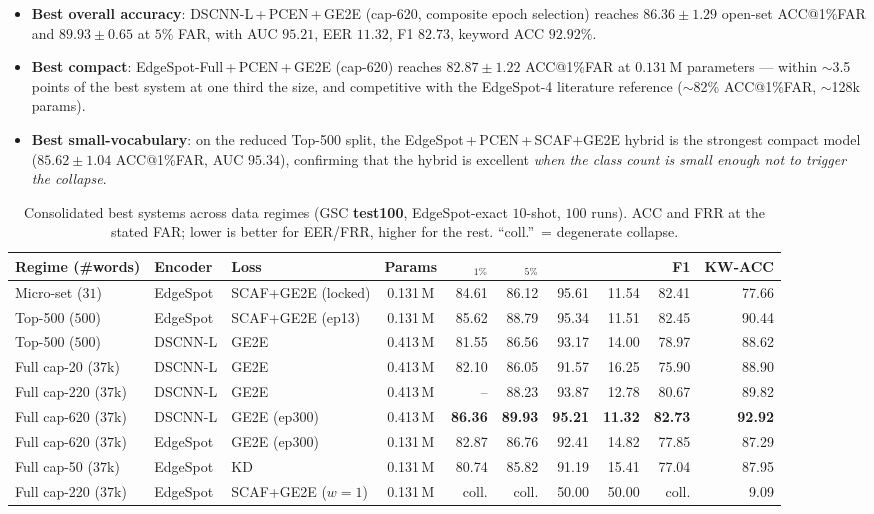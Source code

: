 \documentclass[10pt,twocolumn]{article}
\newcommand{\best}[1]{\textbf{#1}}
\newcommand{\acc}{\text{ACC}}
\newcommand{\eer}{\text{EER}}
\newcommand{\auc}{\text{AUC}}
\begin{document}
\begin{itemize}[leftmargin=1.2em,itemsep=2pt]
\item \textbf{Best overall accuracy}: DSCNN-L\,+\,PCEN\,+\,GE2E (cap-620,
composite epoch selection) reaches \best{$86.36\pm1.29$} open-set ACC@1\%FAR and
$89.93\pm0.65$ at $5\%$ FAR, with AUC $95.21$, EER $11.32$, F1 $82.73$, keyword
ACC $92.92\%$.
\item \textbf{Best compact}: EdgeSpot-Full\,+\,PCEN\,+\,GE2E (cap-620) reaches
$82.87\pm1.22$ ACC@1\%FAR at $0.131$\,M parameters --- within $\sim$3.5 points of
the best system at one third the size, and competitive with the EdgeSpot-4
literature reference ($\sim$82\% ACC@1\%FAR, $\sim$128k params).
\item \textbf{Best small-vocabulary}: on the reduced Top-500 split, the
EdgeSpot\,+\,PCEN\,+\,SCAF$+$GE2E hybrid is the strongest compact model
($85.62\pm1.04$ ACC@1\%FAR, AUC $95.34$), confirming that the hybrid is excellent
\emph{when the class count is small enough not to trigger the collapse}.
\end{itemize}

\begin{table}[t]
\centering
\caption{Consolidated best systems across data regimes (GSC \textbf{test100},
EdgeSpot-exact $10$-shot, $100$ runs). ACC and FRR at the stated FAR; lower is
better for EER/FRR, higher for the rest. ``coll.''\ = degenerate collapse.}
\label{tab:final}
\small
\setlength{\tabcolsep}{4.5pt}
\begin{tabular}{l l l c r r r r r r}
\toprule
\textbf{Regime (\#words)} & \textbf{Encoder} & \textbf{Loss} & \textbf{Params} &
\acc$_{1\%}$ & \acc$_{5\%}$ & \auc & \eer & F1 & KW-ACC\\
\midrule
Micro-set ($31$)   & EdgeSpot & SCAF+GE2E (locked) & 0.131\,M & 84.61 & 86.12 & 95.61 & 11.54 & 82.41 & 77.66 \\
Top-500 ($500$)    & EdgeSpot & SCAF+GE2E (ep13)   & 0.131\,M & 85.62 & 88.79 & 95.34 & 11.51 & 82.45 & 90.44 \\
Top-500 ($500$)    & DSCNN-L  & GE2E               & 0.413\,M & 81.55 & 86.56 & 93.17 & 14.00 & 78.97 & 88.62 \\
Full cap-20 ($37$k)  & DSCNN-L & GE2E              & 0.413\,M & 82.10 & 86.05 & 91.57 & 16.25 & 75.90 & 88.90 \\
Full cap-220 ($37$k) & DSCNN-L & GE2E              & 0.413\,M & {--}  & 88.23 & 93.87 & 12.78 & 80.67 & 89.82 \\
\rowcolor{blue!7}
Full cap-620 ($37$k) & DSCNN-L & GE2E (ep300)      & 0.413\,M & \best{86.36} & \best{89.93} & \best{95.21} & \best{11.32} & \best{82.73} & \best{92.92} \\
Full cap-620 ($37$k) & EdgeSpot & GE2E (ep300)     & 0.131\,M & 82.87 & 86.76 & 92.41 & 14.82 & 77.85 & 87.29 \\
Full cap-50 ($37$k)  & EdgeSpot & KD               & 0.131\,M & 80.74 & 85.82 & 91.19 & 15.41 & 77.04 & 87.95 \\
Full cap-220 ($37$k) & EdgeSpot & SCAF+GE2E ($w{=}1$) & 0.131\,M & {coll.} & {coll.} & 50.00 & 50.00 & {coll.} & 9.09 \\
\bottomrule
\end{tabular}
\end{table}
\end{document}
